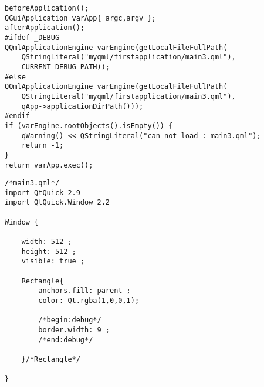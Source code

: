 \begin{lstlisting}[label=f000022,
caption=GoodLuck,
title=\lstlistingname\ \thelstlisting
,firstnumber=111]
beforeApplication();
QGuiApplication varApp{ argc,argv };
afterApplication();
#ifdef _DEBUG
QQmlApplicationEngine varEngine(getLocalFileFullPath(
    QStringLiteral("myqml/firstapplication/main3.qml"),
    CURRENT_DEBUG_PATH));
#else
QQmlApplicationEngine varEngine(getLocalFileFullPath(
    QStringLiteral("myqml/firstapplication/main3.qml"),
    qApp->applicationDirPath()));
#endif
if (varEngine.rootObjects().isEmpty()) {
    qWarning() << QStringLiteral("can not load : main3.qml");
    return -1;
}
return varApp.exec();
\end{lstlisting}          %
\begin{lstlisting}[label=f000025,
caption=GoodLuck,
title=\lstlistingname\ \thelstlisting
]
/*main3.qml*/
import QtQuick 2.9
import QtQuick.Window 2.2

Window {

    width: 512 ;
    height: 512 ;
    visible: true ;

    Rectangle{
        anchors.fill: parent ;
        color: Qt.rgba(1,0,0,1);

        /*begin:debug*/
        border.width: 9 ;
        /*end:debug*/

    }/*Rectangle*/

}
\end{lstlisting}          %



































